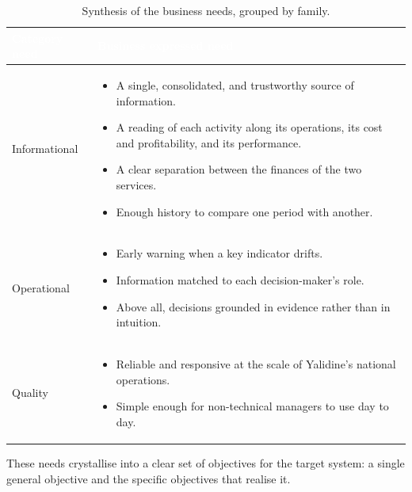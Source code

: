 \begin{table}[H]
\centering
\caption{Synthesis of the business needs, grouped by family.}
\label{tab:ch3-needs}
\renewcommand{\arraystretch}{1.35}
\begin{tabularx}{\linewidth}{|>{\raggedright\arraybackslash}p{3.0cm}|>{\raggedright\arraybackslash}X|}
\hline
\rowcolor{tblheader}
\textcolor{white}{\textbf{Category need}} & \textcolor{white}{\textbf{Business expressed need}} \\
\hline
Informational &
\begin{itemize}[noitemsep, topsep=2pt, leftmargin=*]
    \item A single, consolidated, and trustworthy source of information.
    \item A reading of each activity along its operations, its cost and profitability, and its
          performance.
    \item A clear separation between the finances of the two services.
    \item Enough history to compare one period with another.
\end{itemize} \\
Operational &
\begin{itemize}[noitemsep, topsep=2pt, leftmargin=*]
    \item Early warning when a key indicator drifts.
    \item Information matched to each decision-maker's role.
    \item Above all, decisions grounded in evidence rather than in intuition.
\end{itemize} \\
Quality &
\begin{itemize}[noitemsep, topsep=2pt, leftmargin=*]
    \item Reliable and responsive at the scale of Yalidine's national operations.
    \item Simple enough for non-technical managers to use day to day.
\end{itemize} \\
\hline
\end{tabularx}
\end{table}

These needs crystallise into a clear set of objectives for the target system: a single general
objective and the specific objectives that realise it.

